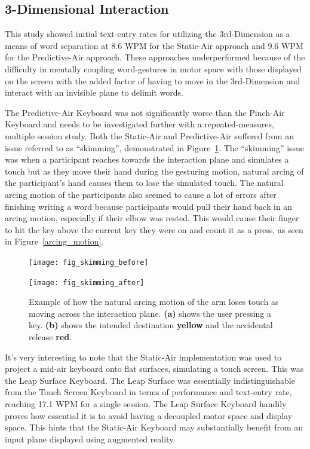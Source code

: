 \subsection{3-Dimensional Interaction}
This study showed initial text-entry rates for utilizing the 3rd-Dimension as a means of word separation at 8.6 WPM for the Static-Air approach and 9.6 WPM for the Predictive-Air approach. These approaches underperformed because of the difficulty in mentally coupling word-gestures in motor space with those displayed on the screen with the added factor of having to move in the 3rd-Dimension and interact with an invisible plane to delimit words.

The Predictive-Air Keyboard was not significantly worse than the Pinch-Air Keyboard and needs to be investigated further with a repeated-measures, multiple session study. Both the Static-Air and Predictive-Air suffered from an issue referred to as ``skimming'', demonstrated in Figure~\ref{skimming_problem}. The ``skimming'' issue was when a participant reaches towards the interaction plane and simulates a touch but as they move their hand during the gesturing motion, natural arcing of the participant's hand causes them to lose the simulated touch. The natural arcing motion of the participants also seemed to cause a lot of errors after finishing writing a word because participants would pull their hand back in an arcing motion, especially if their elbow was rested. This would cause their finger to hit the key above the current key they were on and count it as a press, as seen in Figure~\ref{arcing_motion}.

\begin{figure}[h]
	\centering
	\begin{minipage}[t]{2.5in}
		\texttt{[image: fig\_skimming\_before]}
	\end{minipage}
	\begin{minipage}[t]{2.5in}
		\texttt{[image: fig\_skimming\_after]}
	\end{minipage}
	\caption[Skimming Problem]{Example of how the natural arcing motion of the arm loses touch as moving across the interaction plane. \textbf{(a)} shows the user pressing a key. \textbf{(b)} shows the intended destination \textbf{yellow} and the accidental release \textbf{red}.}
	\label{skimming_problem}
\end{figure}

It's very interesting to note that the Static-Air implementation was used to project a mid-air keyboard onto flat surfaces, simulating a touch screen. This was the Leap Surface Keyboard. The Leap Surface was essentially indistinguishable from the Touch Screen Keyboard in terms of performance and text-entry rate, reaching 17.1 WPM for a single session. The Leap Surface Keyboard handily proves how essential it is to avoid having a decoupled motor space and display space. This hints that the Static-Air Keyboard may substantially benefit from an input plane displayed using augmented reality.

